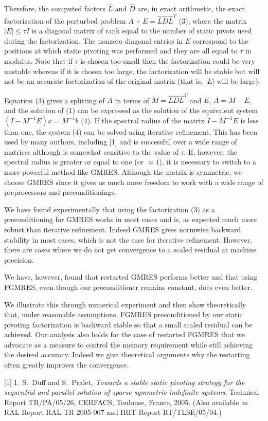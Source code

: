 \documentclass{report}
\begin{document}
Therefore, the computed factors $\hat{L}$ and
$\hat{D}$ are, in exact arithmetic, the exact factorization
of the perturbed problem
$A + E = \hat{L} \hat{D} \hat{L}^T$ (3),
where the matrix
$|E| \le \tau I$ is a diagonal matrix of rank equal to the
number of static pivots used during the factorization. The
nonzero diagonal entries in $E$ correspond to the positions
at which static pivoting was performed and they are all
equal to $\tau$ in modulus. Note that if $\tau$ is chosen
too small then the factorization could be very unstable
whereas if it is chosen too large, the factorization will be
stable but will not be an accurate factorization of the
original matrix (that is, $|E|$ will be large).

Equation (3)
gives a splitting of $A$ in terms of
$M = \hat{L} \hat{D} \hat{L}^T$ and $E$,
$A = M - E$,
and the solution of (1) can be expressed as the
solution of the equivalent system
$(I - M^{-1} E) x = M^{-1}b$ (4).
If the spectral radius of the matrix
$I - M^{-1} E $
is less than one, the system (4) can be
solved using iterative refinement. This has been used by
many authors, including [1] and is successful
over a wide range of matrices although is somewhat sensitive
to the value of $\tau$. If, however, the spectral radius is
greater or equal to one (or $\approx 1$), it is necessary to
switch to a more powerful method like GMRES. Although the
matrix is symmetric, we choose GMRES since it gives us much
more freedom to work with a wide range of preprocessors and
preconditionings.

We have found experimentally that using
the factorization (3) as a preconditioning for
GMRES works in most cases and is, as expected much more
robust than iterative refinement. Indeed GMRES gives
normwise backward stability in most cases, which is not the
case for iterative refinement. However, there are cases
where we do not get convergence to a scaled residual at
machine precision.

We have, however, found that restarted
GMRES performs better and that using FGMRES, even though our
preconditioner remains constant, does even better.

We
illustrate this through numerical experiment and then show
theoretically that, under reasonable assumptions, FGMRES
preconditioned by our static pivoting factorization is
backward stable so that a small scaled residual can be
achieved. Our analysis also holds for the case of restarted
FGMRES that we advocate as a measure to control the memory
requirement while still achieving the desired accuracy.
Indeed we give theoretical arguments why the restarting
often greatly improves the convergence.


[1] I.~S.~Duff and S.~Pralet, {\em Towards a stable static
pivoting strategy for the sequential and parallel solution
of sparse symmetric indefinite systems},
{T}echnical {R}eport TR/PA/05/26, CERFACS,
Toulouse, France, 2005. (Also available as RAL Report
RAL-TR-2005-007 and IRIT Report RT/TLSE/05/04.)



\end{document}
